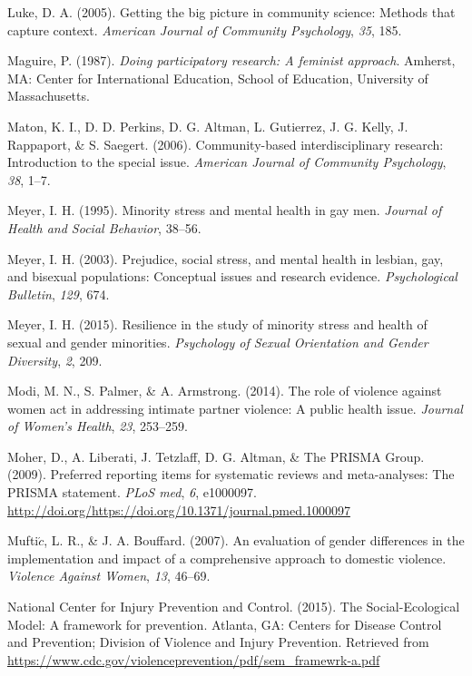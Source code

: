 \documentclass[11pt,]{tufte-book}
\begin{document}
\hypertarget{ref-luke2005getting}{}
Luke, D. A. (2005). Getting the big picture in community science:
Methods that capture context. \emph{American Journal of Community
Psychology}, \emph{35}, 185.

\hypertarget{ref-maguire1987doing}{}
Maguire, P. (1987). \emph{Doing participatory research: A feminist
approach}. Amherst, MA: Center for International Education, School of
Education, University of Massachusetts.

\hypertarget{ref-maton2006community}{}
Maton, K. I., D. D. Perkins, D. G. Altman, L. Gutierrez, J. G. Kelly, J.
Rappaport, \& S. Saegert. (2006). Community-based interdisciplinary
research: Introduction to the special issue. \emph{American Journal of
Community Psychology}, \emph{38}, 1--7.

\hypertarget{ref-meyer1995minority}{}
Meyer, I. H. (1995). Minority stress and mental health in gay men.
\emph{Journal of Health and Social Behavior}, 38--56.

\hypertarget{ref-meyer2003prejudice}{}
Meyer, I. H. (2003). Prejudice, social stress, and mental health in
lesbian, gay, and bisexual populations: Conceptual issues and research
evidence. \emph{Psychological Bulletin}, \emph{129}, 674.

\hypertarget{ref-meyer2015resilience}{}
Meyer, I. H. (2015). Resilience in the study of minority stress and
health of sexual and gender minorities. \emph{Psychology of Sexual
Orientation and Gender Diversity}, \emph{2}, 209.

\hypertarget{ref-modi2014role}{}
Modi, M. N., S. Palmer, \& A. Armstrong. (2014). The role of violence
against women act in addressing intimate partner violence: A public
health issue. \emph{Journal of Women's Health}, \emph{23}, 253--259.

\hypertarget{ref-moher2009preferred}{}
Moher, D., A. Liberati, J. Tetzlaff, D. G. Altman, \& The PRISMA Group.
(2009). Preferred reporting items for systematic reviews and
meta-analyses: The PRISMA statement. \emph{PLoS med}, \emph{6},
e1000097.
\url{http://doi.org/https://doi.org/10.1371/journal.pmed.1000097}

\hypertarget{ref-muftic2007evaluation}{}
Mufti\(\acute{c}\), L. R., \& J. A. Bouffard. (2007). An evaluation of
gender differences in the implementation and impact of a comprehensive
approach to domestic violence. \emph{Violence Against Women}, \emph{13},
46--69.

\hypertarget{ref-centers2015social}{}
National Center for Injury Prevention and Control. (2015). The
Social-Ecological Model: A framework for prevention. Atlanta, GA:
Centers for Disease Control and Prevention; Division of Violence and
Injury Prevention. Retrieved from
\url{https://www.cdc.gov/violenceprevention/pdf/sem_framewrk-a.pdf}
\end{document}
